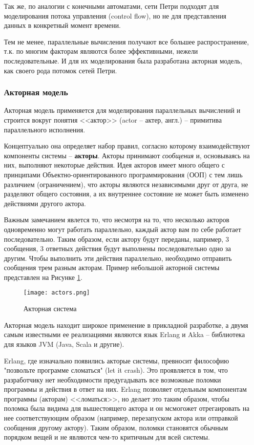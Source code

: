 \documentclass[a4paper,14pt]{extreport} %
\begin{document}
Так же, по аналогии с конечными автоматами, сети Петри подходят для моделирования потока управления (control flow), но не для представления данных в конкретный момент времени.

Тем не менее, параллельные вычисления получают все большее распространение, т.к. по многим факторам являются более эффективными, нежели последовательные. И для их моделирования была разработана акторная модель, как своего рода потомок сетей Петри.


{\subsubsection{Акторная модель}}

Акторная модель применяется для моделирования параллельных вычислений и строится вокруг понятия <<актор>> (actor -- актер, англ.) -- примитива параллельного исполнения.

Концептуально она определяет набор правил, согласно которому взаимодействуют компоненты системы -- \textbf{акторы}. Акторы принимают \textit{сообщения} и, основываясь на них, выполняют некоторые действия. Идея акторов имеет много общего с принципами Объектно-ориентированного программирования (ООП) с тем лишь различием (ограничением), что акторы являются независимыми друг от друга, не разделяют общего состояния, а их внутреннее состояние не может быть изменено действиями другого актора.

Важным замечанием явлется то, что несмотря на то, что несколько акторов одновременно могут работать параллельно, каждый актор вам по себе работает последовательно. Таким образом, если актору будут переданы, например, 3 сообщения, 3 ответных действия будут выполнены последовательно одно за другим. Чтобы выполнить эти действия параллельно, необходимо отправить сообщения трем разным акторам. Пример небольшой акторной системы представлен на Рисунке \ref{actors-1}.

\begin{figure}[h]
\centering
\texttt{[image: actors.png]}
\caption{Акторная система}
\label{actors-1}
\end{figure}

Акторная модель находит широкое применение в прикладной разработке, а двумя самым известными ее реализациями являются язык Erlang и Akka -- библиотека для языков JVM (Java, Scala и другие).

Erlang, где изначально появились акторые системы, превносит философию "позвольте программе сломаться" (let it crash). Это проявляется в том, что разработчику нет необходимости предугадывать все возможные поломки программы и действия в ответ на них. Erlang позволяет отдельным компонентам программы  (акторам) <<ломаться>>, но делает это таким образом, чтобы поломка была видима для вышестоящего актора и он мсмогожет отрегаировать на нее соответствующим образом (например, перезапуском актора или отправкой сообщения другому актору). Таким образом, поломки становятся обычным порядком вещей и не являются чем-то критичным для всей системы.
\end{document}
